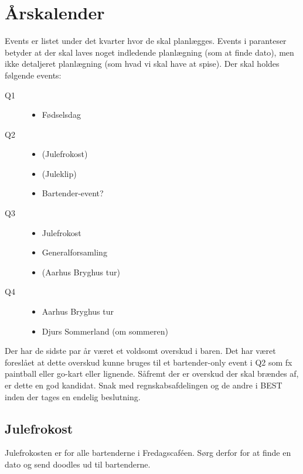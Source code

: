 \section{Årskalender}
\label{sec:arskalender}

Events er listet under det kvarter hvor de skal planlægges. Events i
paranteser betyder at der skal laves noget indledende planlægning (som
at finde dato), men ikke detaljeret planlægning (som hvad vi skal have
at spise). Der skal holdes følgende events:
\begin{description}
\item[Q1]
  \begin{itemize}
  \item Fødselsdag
  \end{itemize}
\item[Q2]
  \begin{itemize}
  \item (Julefrokost)
  \item (Juleklip)
  \item Bartender-event?
  \end{itemize}
\item[Q3]
  \begin{itemize}
  \item Julefrokost
  \item Generalforsamling
  \item (Aarhus Bryghus tur)
  \end{itemize}
\item[Q4]
  \begin{itemize}
  \item Aarhus Bryghus tur
  \item Djurs Sommerland (om sommeren)
  \end{itemize}
\end{description}

Der har de sidste par år været et voldsomt overskud i baren. Det har
været foreslået at dette overskud kunne bruges til et bartender-only
event i Q2 som fx paintball eller go-kart eller lignende. Såfremt der
er overskud der skal brændes af, er dette en god kandidat. Snak med
regnskabsafdelingen og de andre i BEST inden der tages en endelig
beslutning.

\subsection{Julefrokost}
\label{sec:julefrokost}

Julefrokosten er for alle bartenderne i Fredagscaféen. Sørg derfor for
at finde en dato og send doodles ud til bartenderne.

